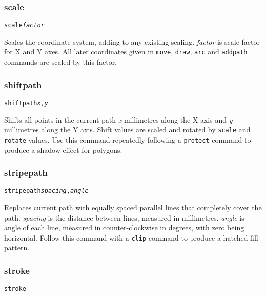 \subsubsection{scale}

\begin{alltt}
scale \textit{factor}
\end{alltt}

Scales the coordinate system, adding to any existing scaling.  \textit{factor}
is scale factor for X and Y axes.  All later coordinates given in
\texttt{move}, \texttt{draw}, \texttt{arc} and \texttt{addpath} commands are
scaled by this factor.

\subsubsection{shiftpath}

\begin{alltt}
shiftpath \textit{x}, \textit{y}
\end{alltt}

Shifts all points in the current path \textit{x} millimetres along the X axis
and \textit{y} millimetres along the Y axis.  Shift values are scaled and
rotated by \texttt{scale} and \texttt{rotate} values.  Use this command
repeatedly following a \texttt{protect} command to produce a shadow effect for
polygons.

\subsubsection{stripepath}

\begin{alltt}
stripepath \textit{spacing}, \textit{angle}
\end{alltt}

Replaces current path with equally spaced parallel lines that completely cover
the path.  \textit{spacing} is the distance between lines, measured in
millimetres.  \textit{angle} is angle of each line, measured in
counter-clockwise in degrees, with zero being horizontal.  Follow this command
with a \texttt{clip} command to produce a hatched fill pattern.

\subsubsection{stroke}

\begin{alltt}
stroke
\end{alltt}

